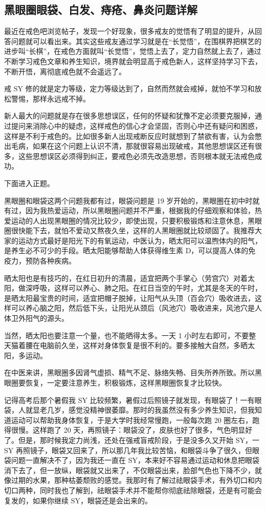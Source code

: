 \documentclass{ctexart}
\begin{document}
\subsection{黑眼圈眼袋、白发、痔疮、鼻炎问题详解}

最近在戒色吧浏览帖子，发现一个好现象，很多戒友的觉悟有了明显的提升，从回答问题就可以看出来。其实这些戒友通过学习就是在“长觉悟”，在围棋界把棋艺的进步叫“长棋”，在戒色方面就叫“长觉悟”，觉悟上去了，定力自然就上去了，通过不断学习戒色文章和养生知识，境界就会明显高于戒色新人，这样坚持学习下去，不断开悟，离彻底戒色就不会遥远了。

戒 SY 修的就是定力等级，定力等级达到了，自然而然就会戒掉，就怕不学习和放松警惕，那样永远戒不掉。

新人最大的问题就是存在很多思想误区，任何的怀疑和犹豫不定必须要克服掉，通过提问来消除心中的疑虑，这样戒色的信心才会坚固，否则心中还有疑问和困惑，这样是不利于戒色的。比如很多新人出现戒断反应时就想到了禁欲有害，认为会憋出毛病，如果在这个问题上认识不清，那就很容易出现破戒，其他思想误区还有很多，这些思想误区必须得到纠正，要戒色必须先改造思想，否则根本就无法戒色成功。

下面进入正题。

黑眼圈和眼袋这两个问题我都有过，眼袋问题是 19 岁开始的，黑眼圈在初中时就有过，因为我热爱运动，所以黑眼圈问题并不严重，根据我的仔细观察和体验，热爱运动的人出现黑眼圈的情况比较少，即使出现，只要积极锻炼和注意休息，黑眼圈很快能下去，就怕不爱动又熬夜久坐，这样的人黑眼圈就比较顽固了。我推荐大家的运动方式最好是阳光下的有氧运动，中医认为，晒太阳可以温煦体内的阳气，是养生必不可少的手段。晒太阳能够帮助人体获得维生素 D，可以提高人体的免疫力，预防各种疾病。

晒太阳也是有技巧的，在红日初升的清晨，适宜把两个手掌心（劳宫穴）对着太阳，做深呼吸，这样可以养心、肺之阳。在红日当空的午时，尤其是冬天的午时，是晒太阳最宝贵的时间，适宜把帽子脱掉，让阳气从头顶（百会穴）吸收进去，这样可以养心脑之阳，然后低下头，让阳光从颈后（风池穴）吸收进来，风池穴是人体卫外阳气的源头。

当然，晒太阳也要注意一个量，也不能晒得太多。一天 1 小时左右即可，不要整天猫着腰在电脑前久坐，这样对身体恢复是很不利的。要多接触大自然，多晒太阳，多运动。

在中医来讲，黑眼圈多因肾气虚损、精气不足、脉络失畅、目失所养所致。所以黑眼圈要恢复，一定要注意养生，积极锻炼，这样黑眼圈恢复才比较快。

记得高考后那个暑假我 SY 比较频繁，暑假过后照镜子就发现，有眼袋了！一有眼袋，人就显老几岁，感觉没精神很萎靡。那时的我虽然没有多少养生知识，但我知道运动可以帮助我身体恢复，于是大学时我经常慢跑，一般每次跑 20 圈左右，跑得很慢。这样跑了 20 天，再照镜子：眼袋没了，皮肤也好了很多，气色明显好了。但是，那时候我定力尚浅，还处在强戒盲戒阶段，于是没多久又开始 SY，一 SY 再照镜子，眼袋又回来了，所以那几年我比较苦恼，和眼袋斗争了很久，但眼袋问题一直解决不了，因为我还一直在 SY，本来好不容易通过运动和休息把眼袋消下去了，但一放纵，眼袋就又出来了，不仅眼袋出来，脸部气色也下降不少，就像过期的水果，那种枯萎颓败的感觉。我那时有了解过祛眼袋手术，有外切口和内切口两种，同时我也了解到，祛眼袋手术并不能帮你彻底祛除眼袋，还是有可能会复发的，如果你继续 SY，眼袋还是会出来的。
\end{document}
